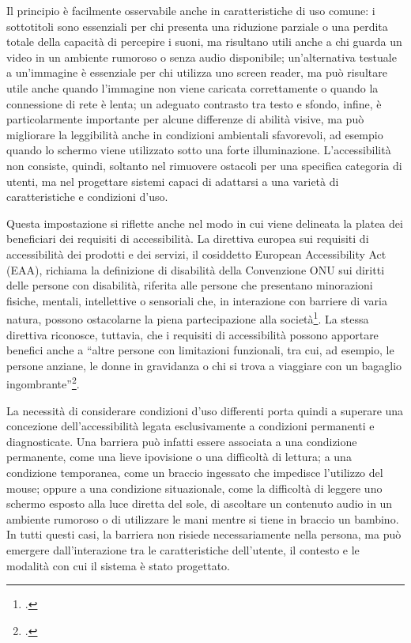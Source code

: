 Il principio è facilmente osservabile anche in caratteristiche di uso comune: i sottotitoli sono essenziali per chi presenta una riduzione parziale o una perdita totale della capacità di percepire i suoni, ma risultano utili anche a chi guarda un video in un ambiente rumoroso o senza audio disponibile; un'alternativa testuale a un'immagine è essenziale per chi utilizza uno screen reader, ma può risultare utile anche quando l'immagine non viene caricata correttamente o quando la connessione di rete è lenta; un adeguato contrasto tra testo e sfondo, infine, è particolarmente importante per alcune differenze di abilità visive, ma può migliorare la leggibilità anche in condizioni ambientali sfavorevoli, ad esempio quando lo schermo viene utilizzato sotto una forte illuminazione. L'accessibilità non consiste, quindi, soltanto nel rimuovere ostacoli per una specifica categoria di utenti, ma nel progettare sistemi capaci di adattarsi a una varietà di caratteristiche e condizioni d'uso.

Questa impostazione si riflette anche nel modo in cui viene delineata la platea dei beneficiari dei requisiti di accessibilità. La direttiva europea sui requisiti di accessibilità dei prodotti e dei servizi, il cosiddetto European Accessibility Act (EAA), richiama la definizione di disabilità della Convenzione ONU sui diritti delle persone con disabilità, riferita alle persone che presentano minorazioni fisiche, mentali, intellettive o sensoriali che, in interazione con barriere di varia natura, possono ostacolarne la piena partecipazione alla società\footcite[considerando~3, che richiama la Convenzione delle Nazioni Unite sui diritti delle persone con disabilità (UNCRPD), ratificata dall'Unione europea il 21 gennaio 2011]{direttiva:eaa}. La stessa direttiva riconosce, tuttavia, che i requisiti di accessibilità possono apportare benefici anche a \enquote{altre persone con limitazioni funzionali, tra cui, ad esempio, le persone anziane, le donne in gravidanza o chi si trova a viaggiare con un bagaglio ingombrante}\footcite[considerando~4]{direttiva:eaa}. 

La necessità di considerare condizioni d'uso differenti porta quindi a superare una concezione dell'accessibilità legata esclusivamente a condizioni permanenti e diagnosticate. Una barriera può infatti essere associata a una condizione permanente, come una lieve ipovisione o una difficoltà di lettura; a una condizione temporanea, come un braccio ingessato che impedisce l'utilizzo del mouse; oppure a una condizione situazionale, come la difficoltà di leggere uno schermo esposto alla luce diretta del sole, di ascoltare un contenuto audio in un ambiente rumoroso o di utilizzare le mani mentre si tiene in braccio un bambino. In tutti questi casi, la barriera non risiede necessariamente nella persona, ma può emergere dall'interazione tra le caratteristiche dell'utente, il contesto e le modalità con cui il sistema è stato progettato.

